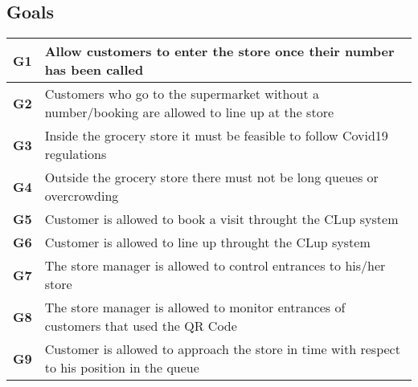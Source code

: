 \subsection{Goals}
\begin{center}
    {\renewcommand{\arraystretch}{2.4}%
    \begin{tabular}{L{2cm}L{14cm}}
        \hline
        \textbf{G1} & Allow customers to enter the store once their number has been called \\
        \hline
        \textbf{G2} & Customers who go to the supermarket without a number/booking are allowed to line up at the store \\
        \hline
        \textbf{G3} & Inside the grocery store it must be feasible to follow Covid19 regulations \\
        \hline
        \textbf{G4} & Outside the grocery store there must not be long queues or overcrowding \\
        \hline
        \textbf{G5} & Customer is allowed to book a visit throught the CLup system \\
        \hline
        \textbf{G6} & Customer is allowed to line up throught the CLup system \\
        \hline
        \textbf{G7} & The store manager is allowed to control entrances to his/her store \\
        \hline
        \textbf{G8} & The store manager is allowed to monitor entrances of customers that used the QR Code \\
        \hline
        \textbf{G9} & Customer is allowed to approach the store in time with respect to his position in the queue \\
        \hline
    \end{tabular}}
\end{center}